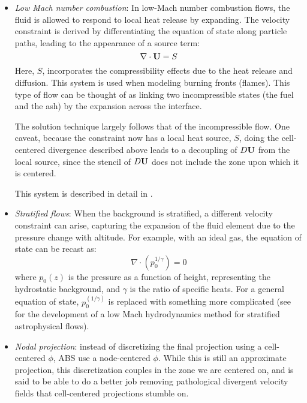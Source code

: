 \begin{itemize}
\item {\em Low Mach number combustion}: In low-Mach number combustion
  flows, the fluid is allowed to respond to local heat release 
  by expanding.  The velocity constraint is derived by differentiating
  the equation of state along particle paths, leading to the appearance
  of a source term:
  \begin{equation}
  \nabla \cdot {\bf U} = S
  \end{equation}
  Here, $S$, incorporates the compressibility effects due to the 
  heat release and diffusion.  This system is used when modeling
  burning fronts (flames).  This type of flow can be thought
  of as linking two incompressible states (the fuel and the ash)
  by the expansion across the interface.

  The solution technique largely follows that of the incompressible
  flow.  One caveat, because the constraint now has a local heat
  source, $S$, doing the cell-centered divergence described above
  leads to a decoupling of $D{\bf U}$ from the local source, since the
  stencil of $D{\bf U}$ does not include the zone upon which it is centered.

  This system is described in detail in \cite{pember-flame,
    DayBell:2000,SNpaper}.

\item {\em Stratified flows}: When the background is stratified, a
  different velocity constraint can arise, capturing the expansion of
  the fluid element due to the pressure change with altitude.  For example,
  with an ideal gas, the equation of state can be recast as:
  \begin{equation}
  \nabla \cdot (p_0^{1/\gamma}) = 0
  \end{equation}
  where $p_0(z)$ is the pressure as a function of height,
  representing the hydrostatic background, and $\gamma$ is the ratio
  of specific heats.  For a general equation of state,
  $p_0^(1/\gamma)$ is replaced with something more complicated (see
  \cite{ABRZ:I,ABRZ:II,ABNZ:III} for the development of a low Mach
  hydrodynamics method for stratified astrophysical flows).

\item {\em Nodal projection}: instead of discretizing the final projection
  using a cell-centered $\phi$, ABS use a node-centered $\phi$.  While
  this is still an approximate projection, this discretization couples
  in the zone we are centered on, and is said to be able to do a better
  job removing pathological divergent velocity fields that cell-centered
  projections stumble on.

\end{itemize}



